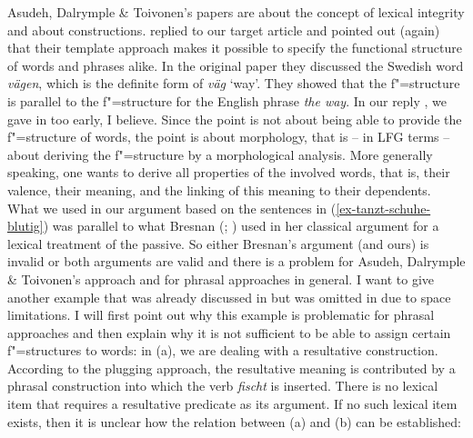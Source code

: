 \addlines
Asudeh, Dalrymple \& Toivonen's papers are about the concept of lexical integrity and about
constructions. \citet{AT2014a} replied to our target article and pointed out (again) that their
template approach makes it possible to specify the functional structure of words and phrases
alike. In the original paper they discussed the Swedish word \emph{vägen}, which is the definite
form of \emph{väg} `way'. They showed that the f"=structure is parallel to the f"=structure for the
English phrase \emph{the way}. 
In our reply \citeyearpar{MWArgStReply}, we gave in too early, I believe. Since the point is
not about being able to provide the f"=structure of words, the point is about morphology, that is
-- in LFG terms -- about deriving the f"=structure by a morphological analysis. More generally
speaking, one wants to derive all properties of the involved words, that is, their valence, their
meaning, and the linking of this meaning to their dependents. What we used in our argument based on
the sentences in (\ref{ex-tanzt-schuhe-blutig}) was parallel to what Bresnan (\citeyear[]{Bresnan82a}; \citeyear[]{Bresnan2001a}) used in her classical argument for a lexical
treatment of the passive. So either Bresnan's argument (and ours) is invalid or both arguments are valid and there is a problem
for Asudeh, Dalrymple \& Toivonen's approach and for phrasal approaches in general. I want to
give another example that was already discussed in  but was omitted in
 due to space limitations. I will first point out why this example is problematic for
phrasal approaches and then explain why it is not sufficient to be able to assign certain
f"=structures to words: in (a), we are dealing with a resultative construction.
According to the plugging approach, the resultative meaning is contributed by a phrasal construction into which the
verb \emph{fischt} is inserted. There is no lexical item that requires a resultative predicate as
its argument. If no such lexical item exists, then it is unclear how the relation between (a)
and (b) can be established: 

